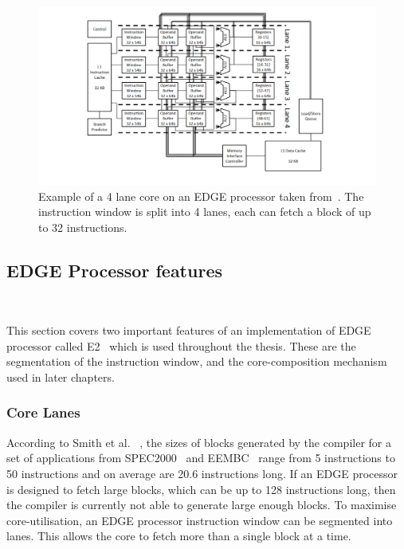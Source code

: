  \begin{figure}[t]
 \center
 \includegraphics[width=1\textwidth]{background/graphics/edge_lanes.pdf}
 \vspace{-4em}
 \caption{Example of a 4 lane core on an EDGE processor taken from~\cite{putnam2010e2}. The instruction window is split into 4 lanes, each can fetch a block of up to 32 instructions.}\label{fig:e2segment}
\vspace{-1em}
 \end{figure}

\subsection{EDGE Processor features}~\label{sec:edge_arch}

This section covers two important features of an implementation of EDGE processor called E2~\cite{putnam2010e2} which is used throughout the thesis.
These are the segmentation of the instruction window, and the core-composition mechanism used in later chapters.

\subsubsection{Core Lanes} 

According to Smith et al. ~\cite{smith2006edge}, the sizes of blocks generated by the compiler for a set of applications from SPEC2000~\cite{spec2000} and EEMBC~\cite{eembc} range from 5 instructions to 50 instructions and on average are 20.6 instructions long.
If an EDGE processor is designed to fetch large blocks, which can be up to 128 instructions long, then the compiler is currently not able to generate large enough blocks.
To maximise core-utilisation, an EDGE processor instruction window can be segmented into lanes.
This allows the core to fetch more than a single block at a time.

